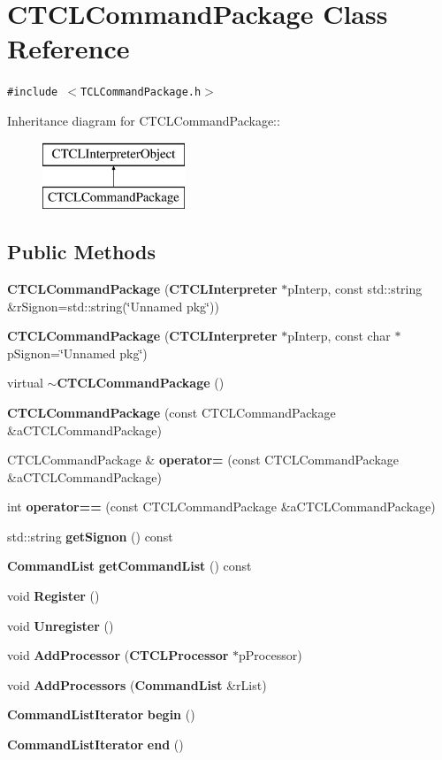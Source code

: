 \section{CTCLCommand\-Package  Class Reference}
\label{classCTCLCommandPackage}
{\tt \#include $<$TCLCommand\-Package.h$>$}

Inheritance diagram for CTCLCommand\-Package::\begin{figure}[H]
\begin{center}
\leavevmode
\includegraphics[height=2cm]{classCTCLCommandPackage}
\end{center}
\end{figure}
\subsection*{Public Methods}
\begin{CompactItemize}
\item 
{\bf CTCLCommand\-Package} ({\bf CTCLInterpreter} $\ast$p\-Interp, const std::string \&r\-Signon=std::string(\char`\"{}Unnamed pkg\char`\"{}))
\item 
{\bf CTCLCommand\-Package} ({\bf CTCLInterpreter} $\ast$p\-Interp, const char $\ast$p\-Signon=\char`\"{}Unnamed pkg\char`\"{})
\item 
virtual {\bf $\sim$CTCLCommand\-Package} ()
\item 
{\bf CTCLCommand\-Package} (const CTCLCommand\-Package \&a\-CTCLCommand\-Package)
\item 
CTCLCommand\-Package \& {\bf operator=} (const CTCLCommand\-Package \&a\-CTCLCommand\-Package)
\item 
int {\bf operator==} (const CTCLCommand\-Package \&a\-CTCLCommand\-Package)
\item 
std::string {\bf get\-Signon} () const
\item 
{\bf Command\-List} {\bf get\-Command\-List} () const
\item 
void {\bf Register} ()
\item 
void {\bf Unregister} ()
\item 
void {\bf Add\-Processor} ({\bf CTCLProcessor} $\ast$p\-Processor)
\item 
void {\bf Add\-Processors} ({\bf Command\-List} \&r\-List)
\item 
{\bf Command\-List\-Iterator} {\bf begin} ()
\item 
{\bf Command\-List\-Iterator} {\bf end} ()
\end{CompactItemize}
